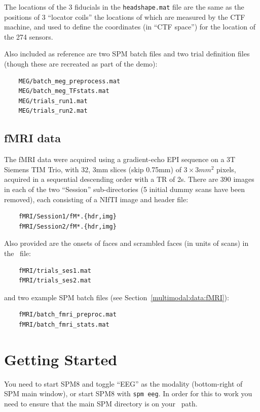 The locations of the 3 fiducials in the \texttt{headshape.mat} file are the same as the positions of 3 ``locator coils'' the locations of which are measured by the CTF machine, and used to define the coordinates (in ``CTF space'') for the location of the 274 sensors.

Also included as reference are two SPM batch files and two trial definition files (though these are recreated as part of the demo):
\begin{verbatim}
    MEG/batch_meg_preprocess.mat
    MEG/batch_meg_TFstats.mat
    MEG/trials_run1.mat
    MEG/trials_run2.mat
\end{verbatim}

\subsection{fMRI data}

The fMRI data were acquired using a gradient-echo EPI sequence on a 3T Siemens TIM Trio, with 32, 3mm slices (skip 0.75mm) of $3\times 3 mm^2$ pixels, acquired in a sequential descending order with a TR of 2s. There are 390 images in each of the two ``Session'' sub-directories (5 initial dummy scans have been removed), each consisting of a NIfTI image and header file:
\begin{verbatim}
    fMRI/Session1/fM*.{hdr,img}
    fMRI/Session2/fM*.{hdr,img}
\end{verbatim}
Also provided are the onsets of faces and scrambled faces (in units of scans) in the \matlab\ file:
\begin{verbatim}
    fMRI/trials_ses1.mat
    fMRI/trials_ses2.mat
\end{verbatim}
and two example SPM batch files (see Section~\ref{multimodal:data:fMRI}):
\begin{verbatim}
    fMRI/batch_fmri_preproc.mat
    fMRI/batch_fmri_stats.mat
\end{verbatim}


\section{Getting Started}

You need to start SPM8 and toggle ``EEG'' as the modality (bottom-right of SPM main window), or start SPM8 with \texttt{spm eeg}. In order for this to work you need to ensure that the main SPM directory is on your \matlab\ path.





